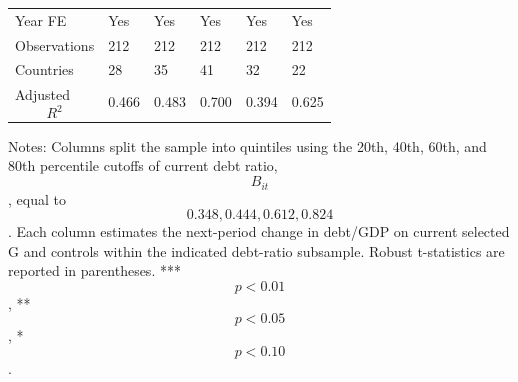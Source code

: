 \begin{table}[H]
\begin{threeparttable}
\begin{tabularx}{\textwidth}{lYYYYY}
Year FE & Yes & Yes & Yes & Yes & Yes \\
Observations & 212 & 212 & 212 & 212 & 212 \\
Countries & 28 & 35 & 41 & 32 & 22 \\
Adjusted $$R^2$$ & 0.466 & 0.483 & 0.700 & 0.394 & 0.625 \\
\bottomrule
\end{tabularx}
\begin{tablenotes}[flushleft]\footnotesize
\item Notes: Columns split the sample into quintiles using the 20th, 40th, 60th, and 80th percentile cutoffs of current debt ratio, $$B_{it}$$, equal to $$0.348, 0.444, 0.612, 0.824$$. Each column estimates the next-period change in debt/GDP on current selected G and controls within the indicated debt-ratio subsample. Robust t-statistics are reported in parentheses. *** $$p<0.01$$, ** $$p<0.05$$, * $$p<0.10$$.
\end{tablenotes}
\end{threeparttable}
\end{table}
